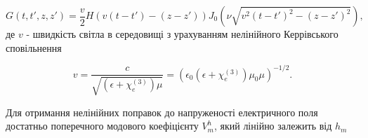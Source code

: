 \begin{equation*}
G(t,t',z,z') = \frac{v}{2} H \left( v (t-t') - (z-z') \right)
J_0 \left( \nu \sqrt{v^2 (t-t')^2 - (z-z')^2} \right),
\end{equation*}
%
де $ v $ - швидкість світла в середовищі з урахуванням нелінійного 
Керрівського сповільнення

\begin{equation}
v = \frac{c}{\sqrt{ \left(\epsilon + \chi_e^{(3)}\right) \mu}} = 
\left( \epsilon_0 
\left( \epsilon + \chi_e^{(3)} \right) \mu_0 \mu \right)^{-1/2}.
\end{equation}

Для отримання нелінійних поправок до напруженості електричного поля достатньо 
поперечного модового коефіцієнту $ V_m^h $, який лінійно залежить від $ h_m $


